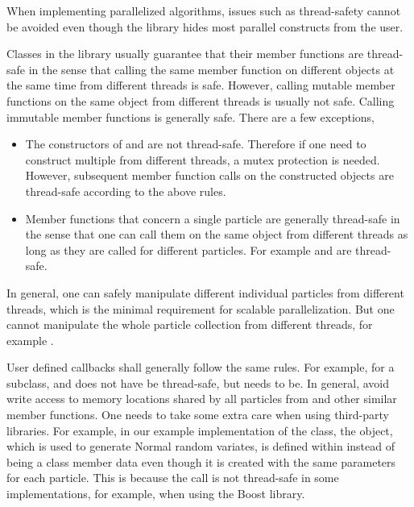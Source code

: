 When implementing parallelized \smc algorithms, issues such as thread-safety
cannot be avoided even though the \vsmc library hides most parallel constructs
from the user.

Classes in the \vsmc library usually guarantee that their member functions are
thread-safe in the sense that calling the same member function on different
objects at the same time from different threads is safe. However, calling
mutable member functions on the same object from different threads is usually
not safe. Calling immutable member functions is generally safe. There are a
few exceptions,
\begin{itemize}
  \item The constructors of  and  are not
    thread-safe. Therefore if one need to construct multiple 
    from different threads, a mutex protection is needed. However, subsequent
    member function calls on the constructed objects are thread-safe according
    to the above rules.
  \item Member functions that concern a single particle are generally
    thread-safe in the sense that one can call them on the same object from
    different threads as long as they are called for different particles. For
    example  and  are
    thread-safe.
\end{itemize}
In general, one can safely manipulate different individual particles from
different threads, which is the minimal requirement for scalable
parallelization. But one cannot manipulate the whole particle collection from
different threads, for example .

User defined callbacks shall generally follow the same rules. For example, for
a  subclass,  and  does
not have be thread-safe, but  needs to be. In general, avoid
write access to memory locations shared by all particles from
 and other similar member functions. One needs to take some
extra care when using third-party libraries. For example, in our example
implementation of the  class, the  object, which is
used to generate Normal random variates, is defined within 
instead of being a class member data even though it is created with the same
parameters for each particle. This is because the call 
is not thread-safe in some implementations, for example, when using the Boost
library.

